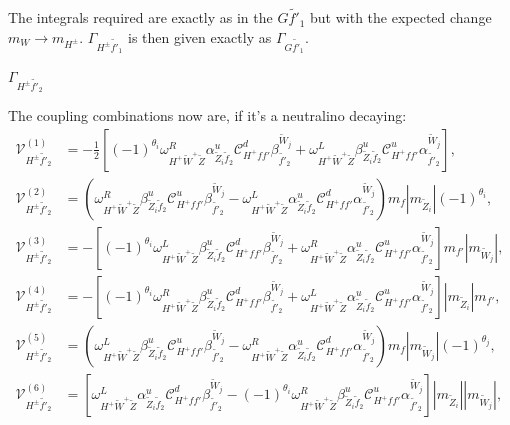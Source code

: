 \documentclass[final,3p,times]{elsarticle}
\begin{document}
The integrals required are exactly as in the $G \tilde{f'}_1$ but with the expected change $m_{W} \rightarrow m_{H^{\pm}}$. 
$\Gamma_{H^{\pm} \tilde{f'}_1}$ is then given exactly as $\Gamma_{G \tilde{f'}_1}$.

\textbf{\underline{$\Gamma_{H^{\pm} \tilde{f'}_2}$}}

The coupling combinations now are, if it's a neutralino decaying:
\begin{align}
\mathcal{V}_{H^{\pm} \tilde{f'}_2}^{(1)} &= -\frac{1}{2}[(-1)^{\theta_i}\omega_{H^+ \tilde{W}^+ \tilde{Z}}^R \alpha_{\tilde{Z}_i \tilde{f}_2}^{u} \mathcal{C}_{H^+ f f'}^d \beta_{\tilde{f'}_2}^{\tilde{W}_j} + \omega_{H^+ \tilde{W}^+ \tilde{Z}}^L \beta_{\tilde{Z}_i \tilde{f}_2}^{u} \mathcal{C}_{H^+ f f'}^u \alpha_{\tilde{f'}_2}^{\tilde{W}_j}], \\
\mathcal{V}_{H^{\pm} \tilde{f'}_2}^{(2)} &= (\omega_{H^+ \tilde{W}^+ \tilde{Z}}^R \beta_{\tilde{Z}_i \tilde{f}_2}^{u}  \mathcal{C}_{H^+ f f'}^u \beta_{\tilde{f'}_2}^{\tilde{W}_j} - \omega_{H^+ \tilde{W}^+ \tilde{Z}}^L \alpha_{\tilde{Z}_i \tilde{f}_2}^{u} \mathcal{C}_{H^+ f f'}^d \alpha_{\tilde{f'}_2}^{\tilde{W}_j})m_{f}|m_{\tilde{Z}_i}|(-1)^{\theta_i}, \\
\mathcal{V}_{H^{\pm} \tilde{f'}_2}^{(3)} &= -[(-1)^{\theta_i}\omega_{H^+ \tilde{W}^+ \tilde{Z}}^L \beta_{\tilde{Z}_i \tilde{f}_2}^{u} \mathcal{C}_{H^+ f f'}^d \beta_{\tilde{f'}_2}^{\tilde{W}_j} +  \omega_{H^+ \tilde{W}^+ \tilde{Z}}^R \alpha_{\tilde{Z}_i \tilde{f}_2}^{u} \mathcal{C}_{H^+ f f'}^u \alpha_{\tilde{f'}_2}^{\tilde{W}_j}]m_{f'}|m_{\tilde{W}_j}|, \\
\mathcal{V}_{H^{\pm} \tilde{f'}_2}^{(4)} &= -[(-1)^{\theta_i}\omega_{H^+ \tilde{W}^+ \tilde{Z}}^R \beta_{\tilde{Z}_i \tilde{f}_2}^{u} \mathcal{C}_{H^+ f f'}^d \beta_{\tilde{f'}_2}^{\tilde{W}_j} + \omega_{H^+ \tilde{W}^+ \tilde{Z}}^L \alpha_{\tilde{Z}_i \tilde{f}_2}^{u} \mathcal{C}_{H^+ f f'}^u \alpha_{\tilde{f'}_2}^{\tilde{W}_j}]|m_{\tilde{Z}_i}|m_{f'}, \\
\mathcal{V}_{H^{\pm} \tilde{f'}_2}^{(5)} &= (\omega_{H^+ \tilde{W}^+ \tilde{Z}}^L \beta_{\tilde{Z}_i \tilde{f}_2}^{u} \mathcal{C}_{H^+ f f'}^u \beta_{\tilde{f'}_2}^{\tilde{W}_j} - \omega_{H^+ \tilde{W}^+ \tilde{Z}}^R \alpha_{\tilde{Z}_i \tilde{f}_2}^{u} \mathcal{C}_{H^+ f f'}^d \alpha_{\tilde{f'}_2}^{\tilde{W}_j})m_{f}|m_{\tilde{W}_j}|(-1)^{\theta_j}, \\
\mathcal{V}_{H^{\pm} \tilde{f'}_2}^{(6)} &= [ \omega_{H^+ \tilde{W}^+ \tilde{Z}}^L \alpha_{\tilde{Z}_i \tilde{f}_2}^{u} \mathcal{C}_{H^+ f f'}^d \beta_{\tilde{f'}_2}^{\tilde{W}_j} - (-1)^{\theta_i}\omega_{H^+ \tilde{W}^+ \tilde{Z}}^R \beta_{\tilde{Z}_i \tilde{f}_2}^{u} \mathcal{C}_{H^+ f f'}^u \alpha_{\tilde{f'}_2}^{\tilde{W}_j}]|m_{\tilde{Z}_i}||m_{\tilde{W}_j}|, \\

\end{align}
\end{document}
